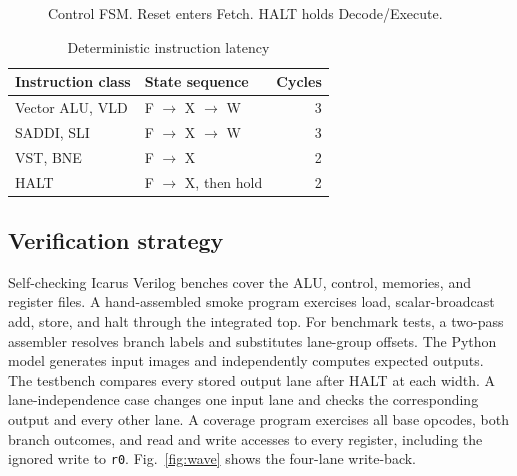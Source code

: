\documentclass[conference]{IEEEtran}
\begin{document}
\begin{figure}[!t]
\centering
{}
\caption{Control FSM. Reset enters Fetch. HALT holds Decode/Execute.}
\label{fig:fsm}
\end{figure}

\begin{table}[!t]
\caption{Deterministic instruction latency}
\label{tab:timing}
\centering
\small
\begin{tabular}{@{}llr@{}}
\toprule
Instruction class & State sequence & Cycles \\
\midrule
Vector ALU, VLD & F $\to$ X $\to$ W & 3 \\
SADDI, SLI & F $\to$ X $\to$ W & 3 \\
VST, BNE & F $\to$ X & 2 \\
HALT & F $\to$ X, then hold & 2 \\
\bottomrule
\end{tabular}
\end{table}

\subsection{Verification strategy}

Self-checking Icarus Verilog benches cover the ALU, control, memories, and
register files. A hand-assembled smoke program exercises load,
scalar-broadcast add, store, and halt through the integrated top. For
benchmark tests, a two-pass assembler resolves branch labels and substitutes
lane-group offsets. The Python model generates input images and independently
computes expected outputs. The testbench compares every stored output lane
after HALT at each width. A lane-independence case changes one input lane
and checks the corresponding output and every other lane. A coverage
program exercises all base opcodes, both branch outcomes, and read and
write accesses to every register, including the ignored write to
\texttt{r0}. Fig.~\ref{fig:wave} shows the four-lane write-back.
\end{document}
